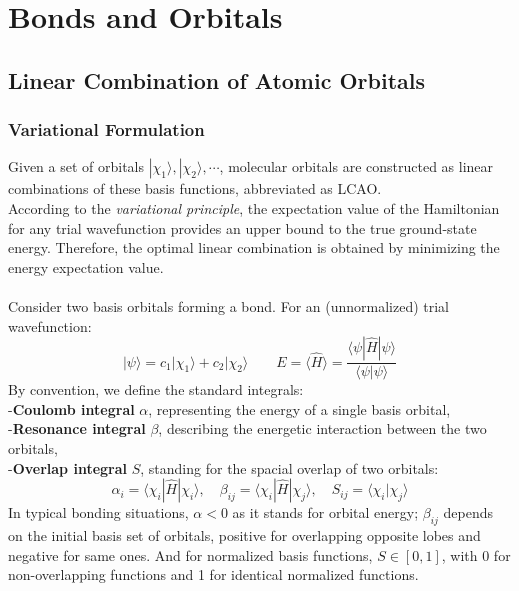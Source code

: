 \chapter{Bonds and Orbitals}

\section{Linear Combination of Atomic Orbitals}

\subsection{Variational Formulation}

	Given a set of orbitals ${|\chi_1\rangle, |\chi_2\rangle, \cdots}$, 
	molecular orbitals are constructed as linear combinations of these basis functions, abbreviated as LCAO.\\
	According to the \emph{variational principle}, 
	the expectation value of the Hamiltonian for any trial wavefunction provides an upper bound to the true ground-state energy. 
	Therefore, the optimal linear combination is obtained by minimizing the energy expectation value.\\\ \\
	Consider two basis orbitals forming a bond. For an (unnormalized) trial wavefunction:
	\[
		|\psi\rangle = 
		c_1|\chi_1\rangle + c_2|\chi_2\rangle 
		\qquad 
		E = 
		\langle\hat{H}\rangle = 
		\frac{\langle\psi| \hat{H} |\psi\rangle}{\langle\psi|\psi\rangle}
	\]
	By convention, we define the standard integrals:\\
	-\textbf{Coulomb integral} $\alpha$, representing the energy of a single basis orbital, \\
	-\textbf{Resonance integral} $\beta$, describing the energetic interaction between the two orbitals, \\
	-\textbf{Overlap integral} $S$, standing for the spacial overlap of two orbitals:
	\[
	\alpha_i = \langle\chi_i|\hat{H}|\chi_i\rangle,
	\quad
	\beta_{ij} = \langle\chi_i|\hat{H}|\chi_j\rangle,
	\quad
	S_{ij} = \langle\chi_i|\chi_j\rangle
	\]
	In typical bonding situations, $\alpha<0$ as it stands for orbital energy;
	$\beta_{ij}$ depends on the initial basis set of orbitals, positive for overlapping opposite lobes and negative for same ones.
	And for normalized basis functions, 
	$S\in[0,1]$, 
	with 0 for non-overlapping functions and 1 for identical normalized functions.\\ \\
